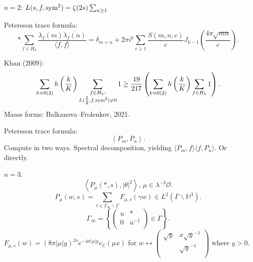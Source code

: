 \documentclass[reqno]{amsart} 
\begin{document}
$n = 2$: $L(s, f, \operatorname{sym}^2) = \zeta(2 s) \sum_{n \geq 1} $



Petersson trace formula:
\begin{equation*}
  \ast \sum_{f \in H_k } \frac{\lambda_f(m) \overline{\lambda_f(n)}}{\langle f, f \rangle}
  = \delta_{m = n}
  + 2 \pi i^k \sum_{c \geq 1} \frac{S(m, n, c)}{c} J_{k - 1} \left( \frac{4 \pi \sqrt{m n}}{c} \right).
\end{equation*}


Khan (2009):
\begin{equation*}
  \sum_{k \equiv 0(2)} h \left( \frac{k}{K} \right)
  \sum_{
    \substack{
      f \in H_k :  \\
      L(\tfrac{1}{2}, f, \operatorname{sym}^2 ) \neq 0      
    }
  }
  1 \geq \frac{19}{217}
  \left( \sum_{k \equiv 0 (2)} h \left( \frac{k}{K} \right) \sum_{f \in H_k } 1 \right).
\end{equation*}
Maass forms: Balkanova--Frolenkov, 2021.

Petersson trace formula:
\begin{equation*}
  \left\langle P_m, P_n \right\rangle.
\end{equation*}
Compute in two ways.  Spectral decomposition, yielding $\langle P_m, f \rangle \langle f, P_n \rangle$.  Or directly.

$n = 3$.
\begin{equation*}
  \left\langle P_\mu(\ast, s), \lvert \theta  \rvert^2 \right\rangle, \, \mu \in \lambda^{- 3} \mathcal{O}.
\end{equation*}
\begin{equation*}
  P_\mu(w, s) = \sum_{t \in \Gamma _\infty \backslash \Gamma } F_{\mu, s}(\gamma w)
  \in L^2(\Gamma \backslash \mathbb{H}^3).
\end{equation*}
\begin{equation*}
  \Gamma _\infty = \left\{
    \begin{pmatrix}
      u      & \ast \\
      0 & u^{-1} \\
    \end{pmatrix} \in \Gamma \right\}.
\end{equation*}
$F_{\mu, s}(w) = \left( 8 \pi \lvert \mu \rvert y \right)^{2 s} e^{- 4 \pi \lvert \mu  \rvert y} e_{\mathbb{C}}(\mu x)$ for $w \leftrightarrow \left(
  \begin{smallmatrix}
    \sqrt{y}  & x \sqrt{y}^{-1} \\
              & \sqrt{y}^{-1}  \\
  \end{smallmatrix}
\right)$ where $y > 0$.
\end{document}
